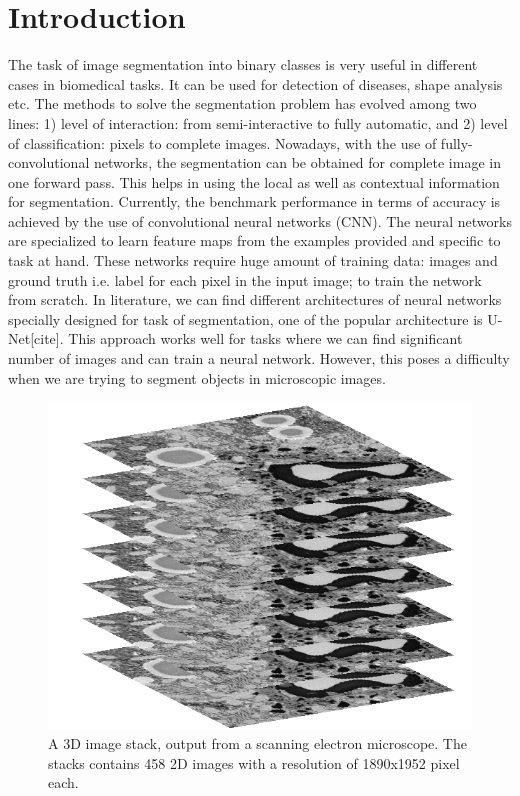 %


\chapter{Introduction}


The task of image segmentation into binary classes is very useful in different cases in biomedical tasks. It can be used for detection of diseases, shape analysis etc. The methods to solve the segmentation problem has evolved among two lines: 1) level of interaction: from semi-interactive to fully automatic, and 2) level of classification: pixels to complete images. Nowadays, with the use of fully-convolutional networks, the segmentation can be obtained for complete image in one forward pass. This helps in using the local as well as contextual information for segmentation. Currently, the benchmark performance in terms of accuracy is achieved by the use of convolutional neural networks (CNN). The neural networks are specialized to learn feature maps from the examples provided and specific to task at hand. These networks require huge amount of training data: images and ground truth i.e. label for each pixel in the input image; to train the network from scratch. In literature, we can find different architectures of neural networks specially designed for task of segmentation, one of the popular architecture is U-Net[cite]. This approach works well for tasks where we can find significant number of images and can train a neural network. However, this poses a difficulty when we are trying to segment objects in microscopic images.

\begin{figure}[h!] \label{fig:3dstack}
 \includegraphics[width=0.8\linewidth]{figures/3d_stack.png}
\caption{A 3D image stack, output from a scanning electron microscope.
The stacks contains 458 2D images with a resolution of 1890x1952 pixel each.}
\end{figure}


